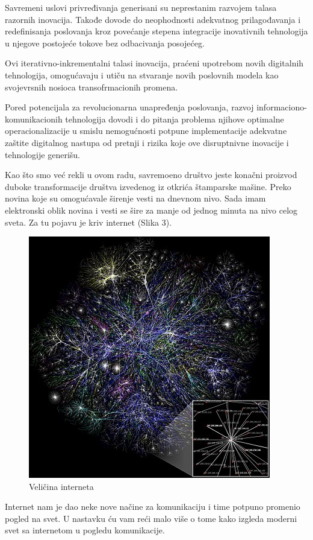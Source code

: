 \documentclass[10pt]{article}
\begin{document}
	Savremeni uslovi privređivanja generisani su neprestanim razvojem talasa razornih inovacija.
	Takođe dovode do neophodnosti adekvatnog prilagođavanja i redefinisanja poslovanja kroz povećanje stepena integracije inovativnih tehnologija u njegove postojeće tokove bez odbacivanja posojećeg.
	
	Ovi iterativno-inkrementalni talasi inovacija, praćeni upotrebom novih digitalnih tehnologija, omogućavaju i utiču na stvaranje novih poslovnih modela kao svojevrsnih nosioca transofrmacionih promena. 
	
	Pored potencijala za revolucionarna unapređenja poslovanja, razvoj informaciono-komunikacionih tehnologija dovodi i do pitanja problema njihove optimalne operacionalizacije u smislu nemogućnosti potpune implementacije adekvatne zaštite digitalnog nastupa od pretnji i rizika koje ove disruptnivne inovacije i tehnologije generišu.
	
	Kao što smo već rekli u ovom radu, savremoeno društvo jeste konačni proizvod duboke transformacije društva izvedenog iz otkrića štamparske mašine. Preko novina koje su omogućavale širenje vesti na dnevnom nivo. Sada imam elektronski oblik novina i vesti se šire za manje od jednog minuta na nivo celog sveta.  Za tu pojavu je kriv internet (Slika 3). 


\begin{figure}
    \centering
    \includegraphics[scale=0.4]{internet.jpg}
    \caption{Veličina interneta}
\end{figure}
	

	Internet nam je dao neke nove načine za komunikaciju i time potpuno promenio pogled na svet. U nastavku ću vam reći malo više o tome kako izgleda moderni svet sa internetom u pogledu komunikacije.
	
\end{document}
